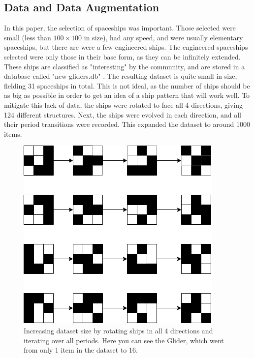 \documentclass{l4proj}
\begin{document}
\subsection{Data and Data Augmentation}

In this paper, the selection of spaceships was important. Those selected were small (less than $100 \times 100$ in size), had any speed, and were usually elementary spaceships, but there are were a few engineered ships. The engineered spaceships selected were only those in their base form, as they can be infinitely extended. These ships are classified as "interesting" by the community, and are stored in a database called "new-gliders.db" \citep{newgliders_db}. The resulting dataset is quite small in size, fielding 31 spaceships in total. This is not ideal, as the number of ships should be as big as possible in order to get an idea of a ship pattern that will work well. To mitigate this lack of data, the ships were rotated to face all 4 directions, giving 124 different structures. Next, the ships were evolved in each direction, and all their period transitions were recorded. This expanded the dataset to around 1000 items.

\begin{figure}[h!]
\centering
\includegraphics[width=\textwidth]{dissertation/images/diagrams/increasing_ship_data.png} 
\caption{Increasing dataset size by rotating ships in all 4 directions and iterating over all periods. Here you can see the Glider, which went from only 1 item in the dataset to 16.}
\label{fig:subim1}
\end{figure}
\end{document}
